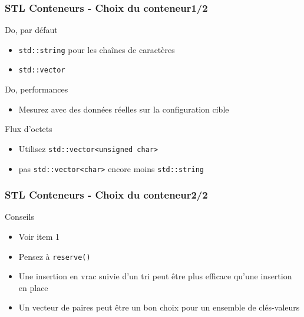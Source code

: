 \documentclass[C++.tex]{subfiles}
\begin{document}
\begin{frame}
	\frametitle{STL Conteneurs - Choix du conteneur\titlehfill{}1/2}
	\begin{exampleblock}{Do, par défaut}
		\begin{itemize}
			\item \lstinline|std::string| pour les chaînes de caractères
			\item \lstinline|std::vector|
		\end{itemize}
	\end{exampleblock}		

	\begin{exampleblock}{Do, performances}
		\begin{itemize}
			\item Mesurez avec des données réelles sur la configuration cible
		\end{itemize}
	\end{exampleblock}

	\begin{alertblock}{Flux d'octets}
		\begin{itemize}
			\item Utilisez \lstinline|std::vector<unsigned char>|
			\item pas \lstinline|std::vector<char>| encore moins \lstinline|std::string|
		\end{itemize}
	\end{alertblock}
\end{frame}

\begin{frame}
	\frametitle{STL Conteneurs - Choix du conteneur\titlehfill{}2/2}
	\begin{block}{Conseils}
		\begin{itemize}
			\item Voir \cite{effStl} item 1
			\item Pensez à \lstinline|reserve()|
			\item Une insertion \og en vrac\fg{} suivie d'un tri peut être plus efficace qu'une insertion en place


			\item Un vecteur de paires peut être un bon choix pour un ensemble de clés-valeurs
		\end{itemize}
	\end{block}
\end{frame}
\end{document}
